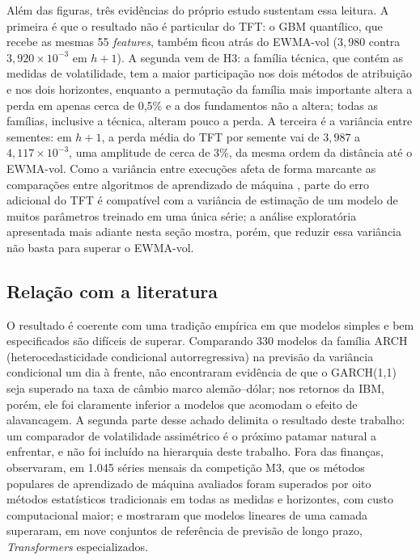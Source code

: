 Além das figuras, três evidências do próprio estudo sustentam essa leitura. A primeira é que o resultado não é particular do TFT: o GBM quantílico, que recebe as mesmas 55 \textit{features}, também ficou atrás do EWMA-vol (\(3{,}980\) contra \(3{,}920 \times 10^{-3}\) em \(h+1\)). A segunda vem de H3: a família técnica, que contém as medidas de volatilidade, tem a maior participação nos dois métodos de atribuição e nos dois horizontes, enquanto a permutação da família mais importante altera a perda em apenas cerca de 0,5\% e a dos fundamentos não a altera; todas as famílias, inclusive a técnica, alteram pouco a perda. A terceira é a variância entre sementes: em \(h+1\), a perda média do TFT por semente vai de \(3{,}987\) a \(4{,}117 \times 10^{-3}\), uma amplitude de cerca de 3\%, da mesma ordem da distância até o EWMA-vol. Como a variância entre execuções afeta de forma marcante as comparações entre algoritmos de aprendizado de máquina \cite{BOUTHILLIER2021}, parte do erro adicional do TFT é compatível com a variância de estimação de um modelo de muitos parâmetros treinado em uma única série; a análise exploratória apresentada mais adiante nesta seção mostra, porém, que reduzir essa variância não basta para superar o EWMA-vol.

\subsection{Relação com a literatura}
O resultado é coerente com uma tradição empírica em que modelos simples e bem especificados são difíceis de superar. Comparando 330 modelos da família ARCH (heterocedasticidade condicional autorregressiva) na previsão da variância condicional um dia à frente,  não encontraram evidência de que o GARCH(1,1) seja superado na taxa de câmbio marco alemão--dólar; nos retornos da IBM, porém, ele foi claramente inferior a modelos que acomodam o efeito de alavancagem. A segunda parte desse achado delimita o resultado deste trabalho: um comparador de volatilidade assimétrico é o próximo patamar natural a enfrentar, e não foi incluído na hierarquia deste trabalho. Fora das finanças,  observaram, em 1.045 séries mensais da competição M3, que os métodos populares de aprendizado de máquina avaliados foram superados por oito métodos estatísticos tradicionais em todas as medidas e horizontes, com custo computacional maior; e  mostraram que modelos lineares de uma camada superaram, em nove conjuntos de referência de previsão de longo prazo, \textit{Transformers} especializados.

